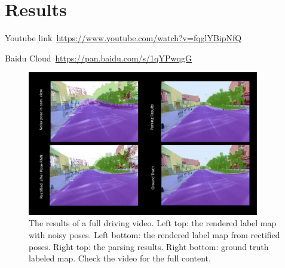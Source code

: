 \documentclass[10pt,twocolumn,letterpaper]{article}
\begin{document}
\section{Results} 
Youtube link~\url{https://www.youtube.com/watch?v=fqglYBipNfQ}

Baidu Cloud~\url{https://pan.baidu.com/s/1qYPwqgG}
\begin{figure}[!hbpt]
\center
\includegraphics[width=0.9\textwidth]{fig/results_video.pdf}
\caption{The results of a full driving video. Left top: the rendered label map with noisy poses. Left bottom: the rendered label map from rectified poses. Right top: the parsing results. Right bottom: ground truth labeled map. Check the video for the full content.}
\label{fig:framework}
\end{figure}

% 
% 
\end{document}
